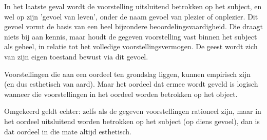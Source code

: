 In het laatste geval wordt de voorstelling uitsluitend betrokken op het subject, en wel op zijn 'gevoel van leven', onder de naam gevoel van plezier of onplezier. Dit gevoel vormt de basis van een heel bijzondere beoordelingsvaardigheid. Die draagt niets bij aan kennis, maar houdt de gegeven voorstelling vast binnen het subject als geheel, in relatie tot het volledige voorstellingsvermogen. De geest wordt zich van zijn eigen toestand bewust via dit gevoel.

Voorstellingen die aan een oordeel ten grondslag liggen, kunnen empirisch zijn (en dus esthetisch van aard). Maar het oordeel dat ermee wordt geveld is logisch wanneer die voorstellingen in het oordeel worden betrokken op het object.

Omgekeerd geldt echter: zelfs als de gegeven voorstellingen rationeel zijn, maar in het oordeel uitsluitend worden betrokken op het subject (op diens gevoel), dan is dat oordeel in die mate altijd esthetisch.

